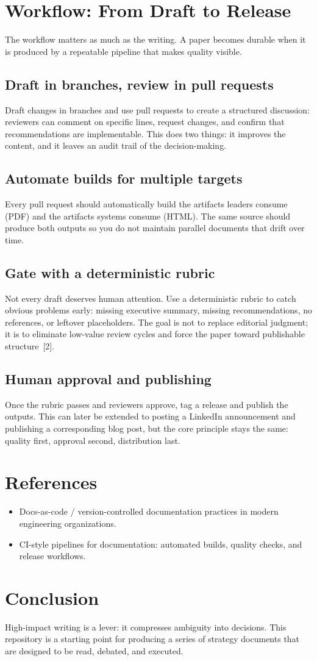 \documentclass[11pt]{article}
\begin{document}
\section{Workflow: From Draft to Release}
The workflow matters as much as the writing. A paper becomes durable when it is produced by a repeatable pipeline that makes quality visible.

\subsection{Draft in branches, review in pull requests}
Draft changes in branches and use pull requests to create a structured discussion: reviewers can comment on specific lines, request changes, and confirm that recommendations are implementable. This does two things: it improves the content, and it leaves an audit trail of the decision-making.

\subsection{Automate builds for multiple targets}
Every pull request should automatically build the artifacts leaders consume (PDF) and the artifacts systems consume (HTML). The same source should produce both outputs so you do not maintain parallel documents that drift over time.

\subsection{Gate with a deterministic rubric}
Not every draft deserves human attention. Use a deterministic rubric to catch obvious problems early: missing executive summary, missing recommendations, no references, or leftover placeholders. The goal is not to replace editorial judgment; it is to eliminate low-value review cycles and force the paper toward publishable structure \,[2].

\subsection{Human approval and publishing}
Once the rubric passes and reviewers approve, tag a release and publish the outputs. This can later be extended to posting a LinkedIn announcement and publishing a corresponding blog post, but the core principle stays the same: quality first, approval second, distribution last.

\section{References}
\begin{itemize}
  \item [1] Docs-as-code / version-controlled documentation practices in modern engineering organizations.
  \item [2] CI-style pipelines for documentation: automated builds, quality checks, and release workflows.
\end{itemize}

\section{Conclusion}
High-impact writing is a lever: it compresses ambiguity into decisions. This repository is a starting point for producing a series of strategy documents that are designed to be read, debated, and executed.
\end{document}
